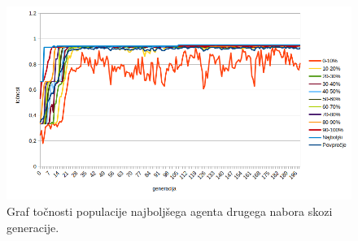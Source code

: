 %

\begin{figure}[H]
    \begin{center}
        \includegraphics[width=13cm]{iris/2/acc}
    \end{center}
    \caption{Graf točnosti populacije najboljšega agenta drugega nabora skozi generacije.}
    \label{fig:iris_acc_2}
\end{figure}

